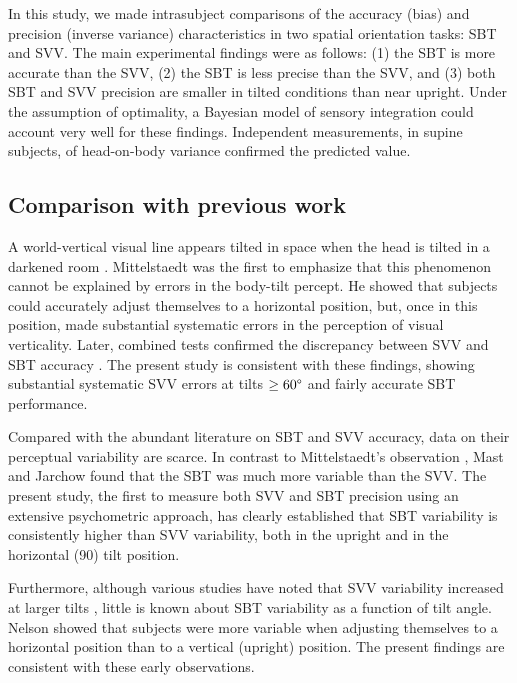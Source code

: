 In this study, we made intrasubject comparisons of the accuracy (bias) and precision (inverse variance) characteristics in two spatial orientation tasks: SBT and SVV. The main experimental findings were as follows: (1) the SBT is more accurate than the SVV, (2) the SBT is less precise than the SVV, and (3) both SBT and SVV precision are smaller in tilted conditions than near upright. Under the assumption of optimality, a Bayesian model of sensory integration could account very well for these findings. Independent measurements, in supine subjects, of head-on-body variance confirmed the predicted value. 


\subsection{Comparison with previous work}
 
A world-vertical visual line appears tilted in space when the head is tilted in a darkened room \cite{aubert1861}. Mittelstaedt \citeyear{mittelstaedt1983} was the first to emphasize that this phenomenon cannot be explained by errors in the body-tilt percept. He showed that subjects could accurately adjust themselves to a horizontal position, but, once in this position, made substantial systematic errors in the perception of visual verticality. Later, combined tests confirmed the discrepancy between SVV and SBT accuracy \cite{mast1996, jarchow1999, vanbeuzekom2000, vanbeuzekom2001, kaptein2004, vingerhoets2008}. The present study is consistent with these findings, showing substantial systematic SVV errors at tilts $\ge60\degree$ and fairly accurate SBT performance. 

Compared with the abundant literature on SBT and SVV accuracy, data on their perceptual variability are scarce. In contrast to Mittelstaedt's observation \citeyear{mittelstaedt1983}, Mast and Jarchow \citeyear{mast1996} found that the SBT was much more variable than the SVV. The present study, the first to measure both SVV and SBT precision using an extensive psychometric approach, has clearly established that SBT variability is consistently higher than SVV variability, both in the upright and in the horizontal (90\textdegree) tilt position. 

Furthermore, although various studies have noted that SVV variability increased at larger tilts \cite{schone1964, schone1968, udodehaes1970, vanbeuzekom2001, devrijer2008}, little is known about SBT variability as a function of tilt angle. Nelson \citeyear{nelson1968} showed that subjects were more variable when adjusting themselves to a horizontal position than to a vertical (upright) position. The present findings are consistent with these early observations. 


